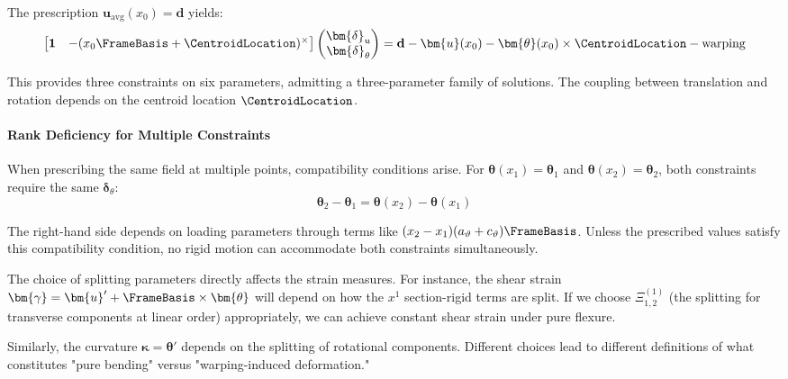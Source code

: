 The prescription $\bm{u}_{\text{avg}}(x_0) = \mathbf{d}$ yields:
\begin{equation}
\begin{bmatrix}
\mathbf{1} & -(x_0\FrameBasis + \CentroidLocation)^{\times}
\end{bmatrix}
\begin{pmatrix}
\bm{\delta}_u \\
\bm{\delta}_\theta
\end{pmatrix}
= \mathbf{d} - \bm{u}(x_0) - \bm{\theta}(x_0) \times \CentroidLocation
- \text{warping}
\end{equation}

This provides three constraints on six parameters, admitting a three-parameter family of solutions. The coupling between translation and rotation depends on the centroid location $\CentroidLocation$.

\paragraph{Rank Deficiency for Multiple Constraints}

When prescribing the same field at multiple points, compatibility conditions arise. For $\bm{\theta}(x_1) = \bm{\theta}_1$ and $\bm{\theta}(x_2) = \bm{\theta}_2$, both constraints require the same $\bm{\delta}_\theta$:
\begin{equation}
\bm{\theta}_2 - \bm{\theta}_1 = \bm{\theta}(x_2) - \bm{\theta}(x_1)
\end{equation}

The right-hand side depends on loading parameters through terms like $(x_2 - x_1)(a_\vartheta + c_\vartheta)\FrameBasis$. Unless the prescribed values satisfy this compatibility condition, no rigid motion can accommodate both constraints simultaneously.

The choice of splitting parameters directly affects the strain measures. 
For instance, the shear strain $\bm{\gamma} = \bm{u}' + \FrameBasis \times \bm{\theta}$ will depend on how the $x^1$ section-rigid terms are split. If we choose $\Xi_{1,2}^{(1)}$ (the splitting for transverse components at linear order) appropriately, we can achieve constant shear strain under pure flexure.

Similarly, the curvature $\bm{\kappa} = \bm{\theta}'$ depends on the splitting of rotational components. Different choices lead to different definitions of what constitutes "pure bending" versus "warping-induced deformation."

